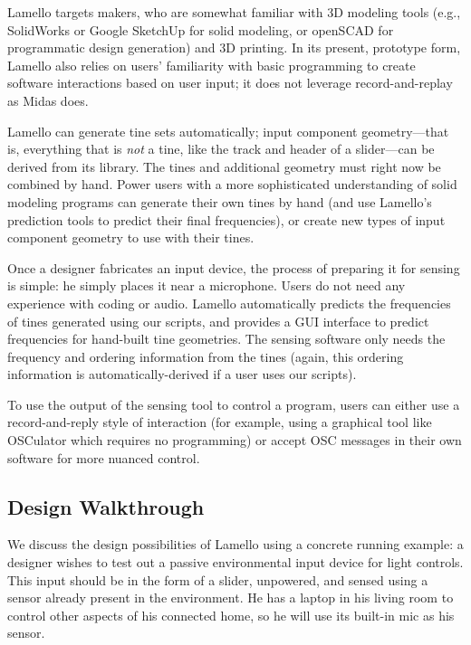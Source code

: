     Lamello targets makers, who are somewhat familiar with 3D modeling tools (e.g., SolidWorks or Google SketchUp for solid modeling, or openSCAD for programmatic design generation) and 3D printing. In its present, prototype form, Lamello also relies on users' familiarity with basic programming to create software interactions based on user input; it does not leverage record-and-replay as Midas does.
    
    Lamello can generate tine sets automatically; input component geometry---that is, everything that is \emph{not} a tine, like the track and header of a slider---can be derived from its library. The tines and additional geometry must right now be combined by hand. Power users with a more sophisticated understanding of solid modeling programs can generate their own tines by hand (and use Lamello's prediction tools to predict their final frequencies), or create new types of input component geometry to use with their tines.
    
    Once a designer fabricates an input device, the process of preparing it for sensing is simple: he simply places it near a microphone. Users do not need any experience with coding or audio. Lamello automatically predicts the frequencies of tines generated using our scripts, and provides a GUI interface to predict frequencies for hand-built tine geometries. The sensing software only needs the frequency and ordering information from the tines (again, this ordering information is automatically-derived if a user uses our scripts).
    
    To use the output of the sensing tool to control a program, users can either use a record-and-reply style of interaction (for example, using a graphical tool like OSCulator which requires no programming) or accept OSC messages in their own software for more nuanced control.
    
    \subsection{Design Walkthrough}
    
     We discuss the design possibilities of Lamello using a concrete running example: a designer wishes to test out a passive environmental input device for light controls. This input should be in the form of a slider, unpowered, and sensed using a sensor already present in the environment. He has a laptop in his living room to control other aspects of his connected home, so he will use its built-in mic as his sensor.
    
